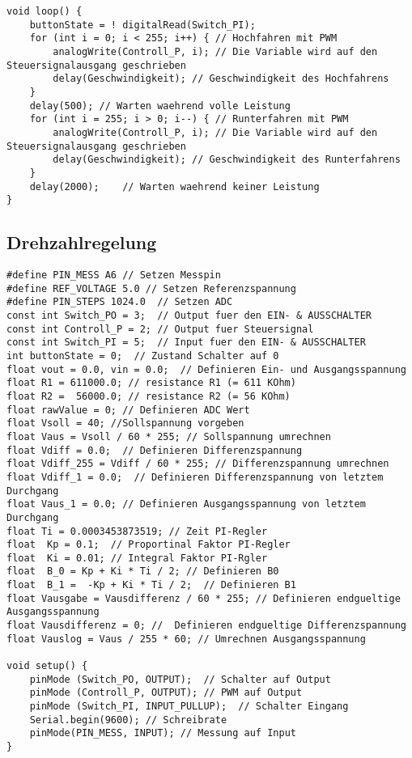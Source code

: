 \begin{appendix}
\begin{lstlisting}[basicstyle=\tiny,style=myArduino]
void loop() {
	buttonState = ! digitalRead(Switch_PI);
	for (int i = 0; i < 255; i++) {	// Hochfahren mit PWM
		analogWrite(Controll_P, i);	// Die Variable wird auf den Steuersignalausgang geschrieben
		delay(Geschwindigkeit);	// Geschwindigkeit des Hochfahrens
	}
	delay(500);	// Warten waehrend volle Leistung
	for (int i = 255; i > 0; i--) {	// Runterfahren mit PWM
		analogWrite(Controll_P, i);	// Die Variable wird auf den Steuersignalausgang geschrieben
		delay(Geschwindigkeit);	// Geschwindigkeit des Runterfahrens
	}
	delay(2000);	// Warten waehrend keiner Leistung
}
\end{lstlisting}

\subsection*{Drehzahlregelung}
\begin{lstlisting}[basicstyle=\tiny,style=myArduino]
#define PIN_MESS A6 // Setzen Messpin
#define REF_VOLTAGE 5.0 // Setzen Referenzspannung
#define PIN_STEPS 1024.0  // Setzen ADC
const int Switch_PO = 3;  // Output fuer den EIN- & AUSSCHALTER
const int Controll_P = 2; // Output fuer Steuersignal
const int Switch_PI = 5;  // Input fuer den EIN- & AUSSCHALTER
int buttonState = 0;  // Zustand Schalter auf 0
float vout = 0.0, vin = 0.0;  // Definieren Ein- und Ausgangsspannung
float R1 = 611000.0; // resistance R1 (= 611 KOhm)
float R2 =  56000.0; // resistance R2 (= 56 KOhm)
float rawValue = 0; // Definieren ADC Wert
float Vsoll = 40; //Sollspannung vorgeben
float Vaus = Vsoll / 60 * 255; // Sollspannung umrechnen
float Vdiff = 0.0;  // Definieren Differenzspannung
float Vdiff_255 = Vdiff / 60 * 255; // Differenzspannung umrechnen
float Vdiff_1 = 0.0;  // Definieren Differenzspannung von letztem Durchgang
float Vaus_1 = 0.0; // Definieren Ausgangsspannung von letztem Durchgang
float Ti = 0.0003453873519; // Zeit PI-Regler
float  Kp = 0.1;  // Proportinal Faktor PI-Regler
float  Ki = 0.01; // Integral Faktor PI-Rgler
float  B_0 = Kp + Ki * Ti / 2; // Definieren B0
float  B_1 =  -Kp + Ki * Ti / 2;  // Definieren B1
float Vausgabe = Vausdifferenz / 60 * 255; // Definieren endgueltige Ausgangsspannung
float Vausdifferenz = 0; //  Definieren endgueltige Differenzspannung
float Vauslog = Vaus / 255 * 60; // Umrechnen Ausgangsspannung

void setup() {
	pinMode (Switch_PO, OUTPUT);  // Schalter auf Output
	pinMode (Controll_P, OUTPUT); // PWM auf Output
	pinMode (Switch_PI, INPUT_PULLUP);  // Schalter Eingang
	Serial.begin(9600); // Schreibrate
	pinMode(PIN_MESS, INPUT); // Messung auf Input
}


\end{lstlisting}
\end{appendix}

